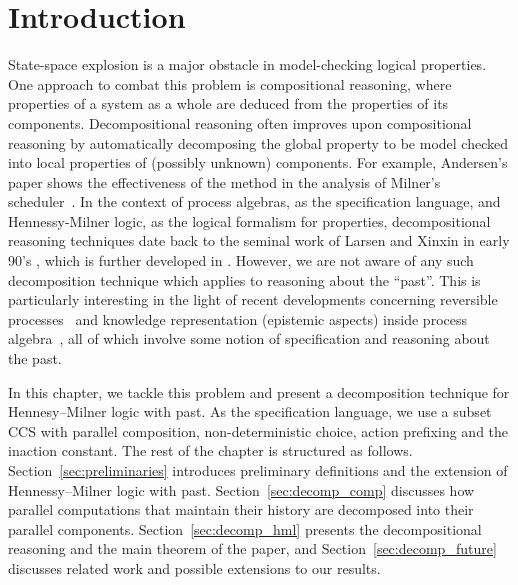 \section{Introduction}
State-space explosion is a major obstacle in model-checking logical properties.
One approach to combat this problem is compositional reasoning,
where properties of a system as a whole are deduced from the properties of its components.
Decompositional reasoning \cite{Giannakopoulou05,Xie05,Andersen95,LaroussinieL95} 
often improves upon compositional reasoning by
automatically decomposing the global property to be model checked
into local properties of (possibly unknown) components.
For example, Andersen's paper shows the effectiveness of the method in the analysis of Milner's scheduler~\cite{Milner89a}.
In the context of process algebras, as the specification language, and Hennessy-Milner logic, as the logical formalism for properties,
decompositional reasoning techniques date back to the seminal work of Larsen and Xinxin in early 90's \cite{Larsen91},
which is further developed in \cite{Simpson04,Fokkink06}. %
However, we are not aware of any such decomposition technique which applies to reasoning about the ``past''.
This is particularly interesting in the light of recent developments concerning reversible processes~\cite{Phillips06} and
knowledge representation (epistemic aspects) inside process algebra~\cite{Mousavi07-LPAR},
all of which involve some notion of specification and reasoning about the past.


In this chapter, we tackle this problem and present a decomposition technique for Hennesy--Milner logic with past.
As the specification language, we use a subset CCS with parallel composition, non-deterministic choice, action prefixing
and the inaction constant.
%
The rest of the chapter is structured as follows. Section~\ref{sec:preliminaries}
introduces preliminary definitions and the extension of Hennessy--Milner logic
with past. Section~\ref{sec:decomp_comp} discusses how parallel computations that maintain
their history are decomposed into their parallel components. Section~\ref{sec:decomp_hml}
presents the decompositional reasoning and the main theorem of the paper, and
Section~\ref{sec:decomp_future} discusses related work and possible extensions to our results.

